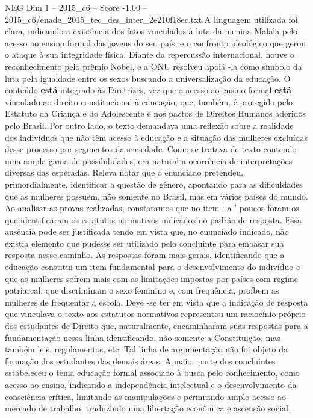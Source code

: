 \begin{textsample}{NEG Dim 1 – 2015\_c6 – Score -1.00 – 2015\_c6/enade\_2015\_tec\_des\_inter\_2e210f18ec.txt}
A linguagem utilizada foi clara, indicando a existência dos fatos vinculados à luta da menina Malala pelo acesso ao ensino formal das jovens do seu país, e o confronto ideológico que gerou o ataque à sua integridade física.
Diante da repercussão internacional, houve o reconhecimento pelo prêmio Nobel, e a ONU resolveu apoiá -la como símbolo da luta pela igualdade entre os sexos buscando a universalização da educação.
O conteúdo \textbf{está} integrado às Diretrizes, vez que o acesso ao ensino formal \textbf{está} vinculado ao direito constitucional à educação, que, também, é protegido pelo Estatuto da Criança e do Adolescente e nos pactos de Direitos Humanos aderidos pelo Brasil.
Por outro lado, o texto demandava uma reflexão sobre a realidade dos indivíduos que não têm acesso à educação e a situação das mulheres excluídas desse processo por segmentos da sociedade.
Como se tratava de texto contendo uma ampla gama de possibilidades, era natural a ocorrência de interpretações diversas das esperadas.
Releva notar que o enunciado pretendeu, primordialmente, identificar a questão de gênero, apontando para as dificuldades que as mulheres possuem, não somente no Brasil, mas em vários países do mundo.
Ao analisar as provas realizadas, constatamos que no item ‘ a ’ poucos foram os que identificaram os estatutos normativos indicados no padrão de resposta.
Essa ausência pode ser justificada tendo em vista que, no enunciado indicado, não existia elemento que pudesse ser utilizado pelo concluinte para embasar sua resposta nesse caminho.
As respostas foram mais gerais, identificando que a educação constitui um item fundamental para o desenvolvimento do indivíduo e que as mulheres sofrem mais com as limitações impostas por países com regime patriarcal, que discriminam o sexo feminino e, com frequência, proíbem as mulheres de frequentar a escola.
Deve -se ter em vista que a indicação de resposta que vinculava o texto aos estatutos normativos representou um raciocínio próprio dos estudantes de Direito que, naturalmente, encaminharam suas respostas para a fundamentação nessa linha identificando, não somente a Constituição, mas também leis, regulamentos, etc.
Tal linha de argumentação não foi objeto da formação dos estudantes das demais áreas.
A maior parte dos concluintes estabeleceu o tema educação formal associado à busca pelo conhecimento, como acesso ao ensino, indicando a independência intelectual e o desenvolvimento da consciência crítica, limitando as manipulações e permitindo amplo acesso ao mercado de trabalho, traduzindo uma libertação econômica e ascensão social.

\end{textsample}
